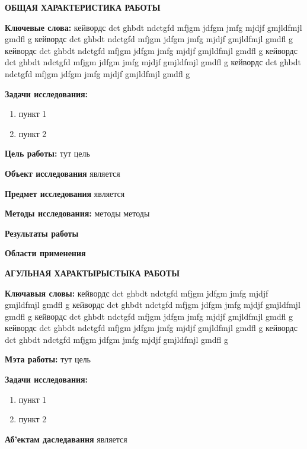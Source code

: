 \newpage
{}

\begin{center}
	\textbf{\large ОБЩАЯ ХАРАКТЕРИСТИКА РАБОТЫ}
\end{center}


\textbf{Ключевые слова:} кейвордс dct ghbdt ndctgfd mfjgm jdfgm jmfg mjdjf gmjldfmjl gmdfl g
кейвордс dct ghbdt ndctgfd mfjgm jdfgm jmfg mjdjf gmjldfmjl gmdfl g
кейвордс dct ghbdt ndctgfd mfjgm jdfgm jmfg mjdjf gmjldfmjl gmdfl g
кейвордс dct ghbdt ndctgfd mfjgm jdfgm jmfg mjdjf gmjldfmjl gmdfl g
кейвордс dct ghbdt ndctgfd mfjgm jdfgm jmfg mjdjf gmjldfmjl gmdfl g


\textbf{Задачи исследования:}
\begin{enumerate}
	\item пункт 1
	\item пункт 2
\end{enumerate}


\textbf{Цель работы:} тут цель


\textbf{Объект исследования} является


\textbf{Предмет исследования} является


\textbf{Методы исследования:} методы методы


\textbf{Результаты работы}


\textbf{Области применения}


\newpage
{}
\begin{center}
	\textbf{\large АГУЛЬНАЯ ХАРАКТЫРЫСТЫКА РАБОТЫ}
\end{center}

\textbf{Ключавыя словы:} кейвордс dct ghbdt ndctgfd mfjgm jdfgm jmfg mjdjf gmjldfmjl gmdfl g
кейвордс dct ghbdt ndctgfd mfjgm jdfgm jmfg mjdjf gmjldfmjl gmdfl g
кейвордс dct ghbdt ndctgfd mfjgm jdfgm jmfg mjdjf gmjldfmjl gmdfl g
кейвордс dct ghbdt ndctgfd mfjgm jdfgm jmfg mjdjf gmjldfmjl gmdfl g
кейвордс dct ghbdt ndctgfd mfjgm jdfgm jmfg mjdjf gmjldfmjl gmdfl g

\textbf{Мэта работы:} тут цель

\textbf{Задачи исследования:}
\begin{enumerate}
	\item пункт 1
	\item пункт 2
\end{enumerate}

\textbf{Аб’ектам даследавання} является



